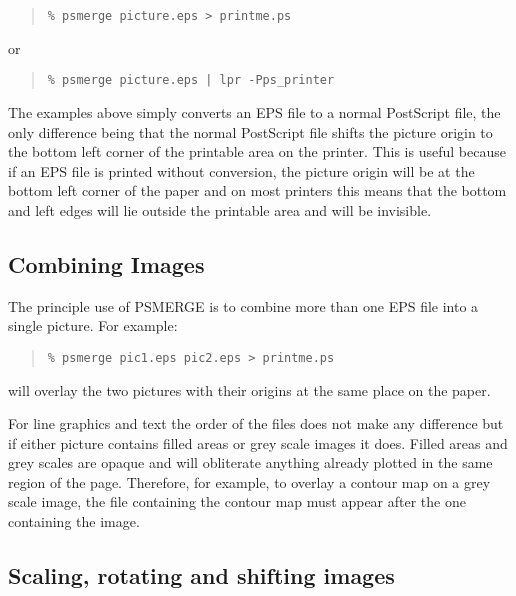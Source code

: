 \documentclass[twoside,11pt]{article}
\newcommand{\xlabel}[1]{}
\begin{document}
\begin{quote}\begin{verbatim}
% psmerge picture.eps > printme.ps
\end{verbatim}\end{quote}
or
\begin{quote}\begin{verbatim}
% psmerge picture.eps | lpr -Pps_printer
\end{verbatim}\end{quote}

The examples above simply converts an EPS file to a normal PostScript
file, the only difference being that the normal PostScript file shifts
the picture origin to the bottom left corner of the printable area on
the printer.  This is useful because if an EPS file is printed without
conversion, the picture origin will be at the bottom left corner of the
paper and on most printers this means that the bottom and left edges
will lie outside the printable area and will be invisible.

\subsection{\xlabel{combining_images}Combining Images}
\label{combining_images}

The principle use of PSMERGE is to combine more than one EPS file into a
single picture.  For example:

\begin{quote}\begin{verbatim}
% psmerge pic1.eps pic2.eps > printme.ps
\end{verbatim}\end{quote}

will overlay the two pictures with their origins at the same place on
the paper.

For line graphics and text the order of the files does not make any
difference but if either picture contains filled areas or grey scale
images it does.  Filled areas and grey scales are opaque and will
obliterate anything already plotted in the same region of the page.
Therefore, for example, to overlay a contour map on a grey scale image,
the file containing the contour map must appear after the one
containing the image.

\subsection{\xlabel{scaling_rotating_and_shifting}%
Scaling, rotating and shifting images}
\label{scaling_rotating_and_shifting}
\end{document}
